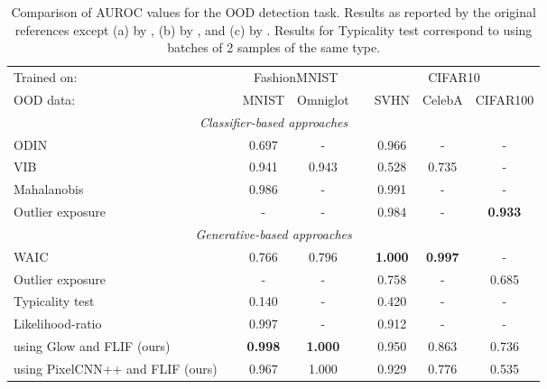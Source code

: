 \documentclass[letterpaper]{article} \usepackage{iclr2020_conference,times}
\begin{document}
\begin{table}[t]
\caption{Comparison of AUROC values for the OOD detection task. Results as reported by the original references except (a) by \citet{Ren19NeurIPS}, (b) by \citet{Lee18NeurIPS}, and (c) by \citet{Choi18ARXIV}. Results for Typicality test correspond to using batches of 2 samples of the same type.}
\label{tab:sota_result}
\begin{center}
\setlength\tabcolsep{3pt}
\begin{tabular}{lccccccc}
\hline
Trained on:                 & & \multicolumn{2}{c}{FashionMNIST}  & & \multicolumn{3}{c}{CIFAR10}   \\
\cline{3-4}\cline{6-8}
OOD data:                            & & MNIST         & Omniglot      & & SVHN      & CelebA    & CIFAR100  \\
\hline
\multicolumn{8}{c}{\textit{Classifier-based approaches}} \\
\hline
ODIN \citep{Liang18ICLR}   & & 0.697         & -           & & 0.966     & -       & -       \\
VIB \citep{Alemi18UAIW}    & & 0.941          & 0.943         & & 0.528     & 0.735     & -       \\
Mahalanobis \citep{Lee18NeurIPS}        & & 0.986         & -           & & 0.991     & -       & -       \\
Outlier exposure \citep{Hendrycks19ICLR}    & & -           & -           & & 0.984     & -       & \textbf{0.933}     \\
\hline
\multicolumn{8}{c}{\textit{Generative-based approaches}} \\
\hline
WAIC \citep{Choi18ARXIV}                    & & 0.766         & 0.796         & & \textbf{1.000}     & \textbf{0.997}     & -       \\
Outlier exposure \citep{Hendrycks19ICLR}    & & -           & -           & & 0.758     & -       & 0.685     \\
Typicality test \citep{Nalisnick19ARXIV}    & & 0.140         & -           & & 0.420     & -       & -       \\
Likelihood-ratio \citep{Ren19NeurIPS}       & & 0.997         & -           & & 0.912     & -       & -       \\
 using Glow and FLIF (ours)              & & \textbf{0.998}         & \textbf{1.000}         & & 0.950     & 0.863     & 0.736    \\
 using PixelCNN++ and FLIF (ours)        & & 0.967         & 1.000         & & 0.929     & 0.776     & 0.535    \\
\hline
\end{tabular}
\end{center}
\end{table}
\end{document}
